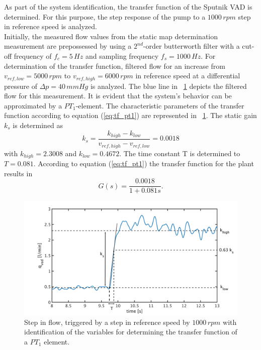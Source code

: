 As part of the system identification, the transfer function of the Sputnik VAD is determined. For this purpose, the step response of the pump to a $1000\,rpm$ step in reference speed is analyzed.
\\Initially, the measured flow values from the static map determination measurement are prepossessed by using a $2^{nd}$-order butterworth filter with a cut-off frequency of $f_c = 5\,Hz$ and sampling frequency $f_s=1000 \, Hz$. For determination of the transfer function, filtered flow for an increase from $v_{ref,low}=5000\,rpm$ to $v_{ref,high}=6000\,rpm$ in reference speed at a differential pressure of $\Delta{p}=40\,mmHg$ is analyzed. The blue line in \figurename~\ref{fig:plant} depicts the filtered flow for this measurement. It is evident that the system's behavior can be approximated by a $PT_1$-element.
 The characteristic parameters of the transfer function according to equation (\ref{eq:tf_pt1}) are represented in \figurename~\ref{fig:plant}. The static gain $k_s$ is determined as
\begin{equation}
  k_s = \frac{k_{high}-k_{low}}{v_{ref,high}-v_{ref,low}}=0.0018
\label{eq:k_s_1}
\end{equation}
with $k_{high}=2.3008$ and $k_{low}=0.4672$. The time constant T is determined to $T=0.081$.
According to equation (\ref{eq:tf_pt1}) the transfer function for the plant results in
\begin{equation}
    G(s) = \frac{0.0018}{1+0.081s}.
 \label{eq:plant}
\end{equation}
\begin{figure}[t]
  \centering
  \includegraphics[width=\textwidth]{images/chapt_4/plant_generation.pdf}
  \caption[Transfer function of Sputnik VAD]{Step in flow, triggered by a step in reference speed by $1000\,rpm$ with identification of the variables for determining the transfer function of a $PT_1$ element.}
  \label{fig:plant}
\end{figure}
